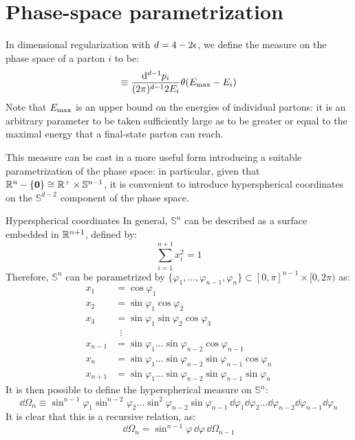 
\section{Phase-space parametrization}

In dimensional regularization with $ d = 4 - 2 \epsilon $, we define the measure on the phase space of a parton $ i $ to be:
\begin{equation}
  [\dd p_i] \equiv \frac{\dd^{d-1} p_i}{(2\pi)^{d-1} 2E_i} \theta(\ema - E_i)
\end{equation}
Note that $ E_\text{max} $ is an upper bound on the energies of individual partons: it is an arbitrary parameter to be taken sufficiently large as to be greater or equal to the maximal energy that a final-state parton can reach.

This measure can be cast in a more useful form introducing a suitable parametrization of the phase space: in particular, given that $ \mathbb{R}^n-\{\mathbf{0}\} \cong \mathbb{R}^+ \times \mathbb{S}^{n-1} $, it is convenient to introduce hyperspherical coordinates on the $ \mathbb{S}^{d-2} $ component of the phase space.

\begin{observation}{Hyperspherical coordinates}{}
  In general, $ \mathbb{S}^n $ can be described as a surface embedded in $ \mathbb{R}^{n+1} $, defined by:
  \begin{equation}
    \sum_{i = 1}^{n+1} x_i^2 = 1
  \end{equation}
  Therefore, $ \mathbb{S}^n $ can be parametrized by  $ \{\varphi_1 , \dots, \varphi_{n-1}, \varphi_n\} \subset [0,\pi]^{n-1} \times [0,2\pi) $ as:
  \begin{equation}
    \begin{split}
      x_1 &= \cos \varphi_1 \\
      x_2 &= \sin \varphi_1 \cos \varphi_2 \\
      x_3 &= \sin \varphi_1 \sin \varphi_2 \cos \varphi_3 \\
          &\,\,\,\vdots \\
      x_{n-1} &= \sin \varphi_1 \dots \sin \varphi_{n-2} \cos \varphi_{n-1} \\
      x_n &= \sin \varphi_1 \dots \sin \varphi_{n-2} \sin \varphi_{n-1} \cos \varphi_n \\
      x_{n+1} &= \sin \varphi_1 \dots \sin \varphi_{n-2} \sin \varphi_{n-1} \sin \varphi_n
    \end{split}
  \end{equation}
  It is then possible to define the hyperspherical measure on $ \mathbb{S}^n $:
  \begin{equation}
    \dd \Omega_n \equiv \sin^{n-1} \varphi_1 \sin^{n-2} \varphi_2 \dots \sin^2 \varphi_{n-2} \sin \varphi_{n-1} \, \dd \varphi_1 \dd \varphi_2 \dots \dd \varphi_{n-2} \dd \varphi_{n-1} \dd \varphi_n
  \end{equation}
  It is clear that this is a recursive relation, as:
  \begin{equation}
    \dd \Omega_n = \sin^{n-1} \varphi \, \dd \varphi \, \dd \Omega_{n-1}
    \label{eq:hyp-rec}
  \end{equation}
\end{observation}

